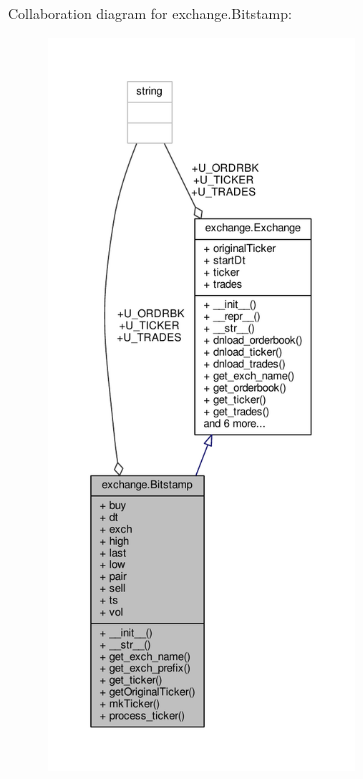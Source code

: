 Collaboration diagram for exchange.\+Bitstamp\+:
\nopagebreak
\begin{figure}[H]
\begin{center}
\leavevmode
\includegraphics[height=550pt]{classexchange_1_1_bitstamp__coll__graph}
\end{center}
\end{figure}
